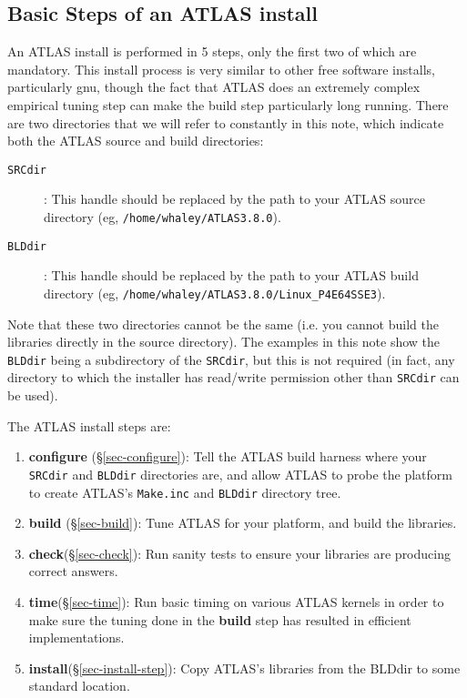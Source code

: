 \documentclass[11pt]{article}
\begin{document}
\subsection{Basic Steps of an ATLAS install}
An ATLAS install is performed in 5 steps, only the first two of which
are mandatory.
This install process is very similar to other free software installs,
particularly gnu, though the fact that ATLAS does an extremely complex
empirical tuning step can make the build step particularly long running.
There are two directories that we will refer to constantly in this note,
which indicate both the ATLAS source and build directories:
\begin{description}
\item[{\tt SRCdir}]: This handle should be replaced by the path to your
      ATLAS source directory (eg, {\tt /home/whaley/ATLAS3.8.0}).
\item[{\tt BLDdir}]: This handle should be replaced by the path to your
      ATLAS build directory (eg, {\tt /home/whaley/ATLAS3.8.0/Linux\_P4E64SSE3}).
\end{description}
Note that these two directories cannot be the same (i.e. you cannot build
the libraries directly in the source directory).  The examples in this
note show the {\tt BLDdir} being a subdirectory of the {\tt SRCdir}, but
this is not required (in fact, any directory to which the installer has
read/write permission other than {\tt SRCdir} can be used).

\vspace*{0.1in}
\noindent
The ATLAS install steps are:
\begin{enumerate}
\item {\bf configure} (\S\ref{sec-configure}): 
      Tell the ATLAS build harness where your {\tt SRCdir}
      and {\tt BLDdir} directories are, and allow ATLAS to probe the
      platform to create ATLAS's {\tt Make.inc} and {\tt BLDdir} directory
      tree.
\item {\bf build} (\S\ref{sec-build}): 
                  Tune ATLAS for your platform, and build the libraries.
\item {\bf check}\footnotemark[1] (\S\ref{sec-check}):
                  Run sanity tests to ensure your libraries are producing
                   correct answers.
\item {\bf time}\footnotemark[1] (\S\ref{sec-time}):
                  Run basic timing on various ATLAS kernels in order to
                  make sure the tuning done in the {\bf build} step
                  has resulted in efficient implementations.
\item {\bf install}\footnotemark[1] (\S\ref{sec-install-step}):
                  Copy ATLAS's libraries from the BLDdir to some
                  standard location.
\end{enumerate}
\end{document}
